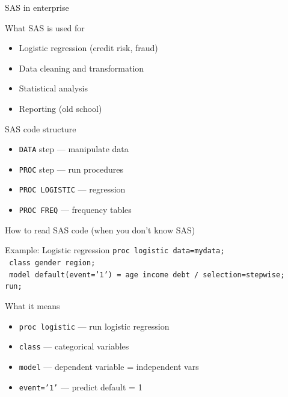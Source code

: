 \documentclass[aspectratio=169, 11pt]{beamer}
\begin{document}
	\begin{frame}{SAS in enterprise}
		\tiny
		\begin{block}{What SAS is used for}
			\begin{itemize}
				\item Logistic regression (credit risk, fraud)
				\item Data cleaning and transformation
				\item Statistical analysis
				\item Reporting (old school)
			\end{itemize}
		\end{block}
		\begin{block}{SAS code structure}
			\tiny
			\begin{itemize}
				\item \texttt{DATA} step — manipulate data
				\item \texttt{PROC} step — run procedures
				\item \texttt{PROC LOGISTIC} — regression
				\item \texttt{PROC FREQ} — frequency tables
			\end{itemize}
		\end{block}
	\end{frame}
	
	\begin{frame}{How to read SAS code (when you don't know SAS)}
		\tiny
		\begin{block}{Example: Logistic regression}
			\scriptsize
			\texttt{proc logistic data=mydata;}\\
			\texttt{   class gender region;}\\
			\texttt{   model default(event='1') = age income debt / selection=stepwise;}\\
			\texttt{run;}
		\end{block}
		\vspace{0.05cm}
		\begin{block}{What it means}
			\tiny
			\begin{itemize}
				\item \texttt{proc logistic} — run logistic regression
				\item \texttt{class} — categorical variables
				\item \texttt{model} — dependent variable = independent vars
				\item \texttt{event='1'} — predict default = 1
			\end{itemize}
		\end{block}
	\end{frame}
	
\end{document}
